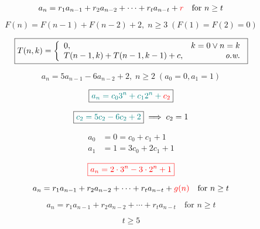 \begin{frame}{}
  \centerline{}

  \[
    a_n = r_1 a_{n-1} + r_2 a_{n-2} + \cdots + r_t a_{n-t} + \textcolor{red}{r} \quad \text{for } n \ge t
  \]

  \pause
  \[
    F(n) = F(n-1) + F(n-2) + 2, \; n \ge 3\; (F(1) = F(2) = 0)
  \]

  \pause
  \vspace{-0.30cm}
  \[
    \boxed{T(n,k) = \left\{\begin{array}{lr}
      0, & k = 0 \lor n = k \\
      T(n-1, k) + T(n-1, k-1) + c, & \text{\it o.w.}
    \end{array}\right.}
  \]
\end{frame}

\begin{frame}{}
  \[
    a_n = 5a_{n-1} - 6a_{n-2} + 2, \; n \ge 2 \; (a_0 = 0, a_1 = 1)
  \]

  \pause
  \[
    \boxed{\textcolor{teal}{a_n = c_0 3^n + c_1 2^n + \textcolor{red}{c_2}}}
  \]

  \pause
  \[
    \boxed{\textcolor{teal}{c_2 = 5c_2 - 6c_2 + 2}} \implies c_2 = 1
  \]

  \pause
  \begin{align*}
    a_0 &= 0 = c_0 + c_1 + 1\\
    a_1 &= 1 = 3c_0 + 2c_1 + 1
  \end{align*}

  \pause
  \[
    \textcolor{red}{\boxed{a_n = 2 \cdot 3^n - 3 \cdot 2^n + 1}}
  \]
\end{frame}

\begin{frame}{}
  \centerline{}
\end{frame}

\begin{frame}{}
  \[
    a_n = r_1 a_{n-1} + r_2 a_{n-2} + \cdots + r_t a_{n-t} + \textcolor{red}{g(n)} \quad \text{for } n \ge t
  \]

  \pause
\end{frame}

\begin{frame}{}
  \[
    a_n = r_1 a_{n-1} + r_2 a_{n-2} + \cdots + r_t a_{n-t} \quad \text{for } n \ge t
  \]

  \pause
  \[
    t \ge 5
  \]

  \pause
  \begin{columns}
  \end{columns}

  \pause
  \vspace{0.50cm}
  \centerline{}
\end{frame}

